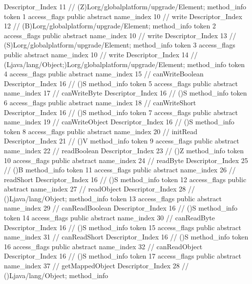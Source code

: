 {{{{{					Descriptor_Index	11		// (Z)Lorg/globalplatform/upgrade/Element;
				}
				method_info {
					token	1
					access_flags	public abstract
					name_index	10		// write
					Descriptor_Index	12		// (B)Lorg/globalplatform/upgrade/Element;
				}
				method_info {
					token	2
					access_flags	public abstract
					name_index	10		// write
					Descriptor_Index	13		// (S)Lorg/globalplatform/upgrade/Element;
				}
				method_info {
					token	3
					access_flags	public abstract
					name_index	10		// write
					Descriptor_Index	14		// (Ljava/lang/Object;)Lorg/globalplatform/upgrade/Element;
				}
				method_info {
					token	4
					access_flags	public abstract
					name_index	15		// canWriteBoolean
					Descriptor_Index	16		// ()S
				}
				method_info {
					token	5
					access_flags	public abstract
					name_index	17		// canWriteByte
					Descriptor_Index	16		// ()S
				}
				method_info {
					token	6
					access_flags	public abstract
					name_index	18		// canWriteShort
					Descriptor_Index	16		// ()S
				}
				method_info {
					token	7
					access_flags	public abstract
					name_index	19		// canWriteObject
					Descriptor_Index	16		// ()S
				}
				method_info {
					token	8
					access_flags	public abstract
					name_index	20		// initRead
					Descriptor_Index	21		// ()V
				}
				method_info {
					token	9
					access_flags	public abstract
					name_index	22		// readBoolean
					Descriptor_Index	23		// ()Z
				}
				method_info {
					token	10
					access_flags	public abstract
					name_index	24		// readByte
					Descriptor_Index	25		// ()B
				}
				method_info {
					token	11
					access_flags	public abstract
					name_index	26		// readShort
					Descriptor_Index	16		// ()S
				}
				method_info {
					token	12
					access_flags	public abstract
					name_index	27		// readObject
					Descriptor_Index	28		// ()Ljava/lang/Object;
				}
				method_info {
					token	13
					access_flags	public abstract
					name_index	29		// canReadBoolean
					Descriptor_Index	16		// ()S
				}
				method_info {
					token	14
					access_flags	public abstract
					name_index	30		// canReadByte
					Descriptor_Index	16		// ()S
				}
				method_info {
					token	15
					access_flags	public abstract
					name_index	31		// canReadShort
					Descriptor_Index	16		// ()S
				}
				method_info {
					token	16
					access_flags	public abstract
					name_index	32		// canReadObject
					Descriptor_Index	16		// ()S
				}
				method_info {
					token	17
					access_flags	public abstract
					name_index	37		// getMappedObject
					Descriptor_Index	28		// ()Ljava/lang/Object;
				}
				method_info {
}}}}}
